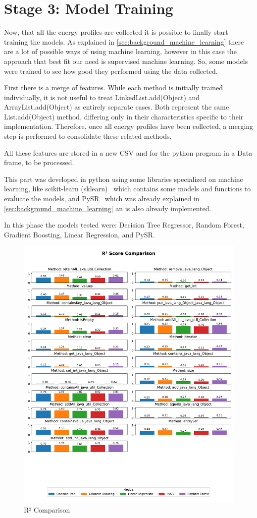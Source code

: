 \section{Stage 3: Model Training} \label{sec:work_stage3_model_training}

Now, that all the energy profiles are collected it is possible to finally start training the models. As explained in \ref{sec:background_machine_learning} there are a lot of possible ways of using machine learning, however in this case the approach that best fit our need is supervised machine learning. So, some models were trained to see how good they performed using the data collected.

First there is a merge of features. While each method is initially trained individually, it is not useful to treat LinkedList.add(Object) and ArrayList.add(Object) as entirely separate cases. Both represent the same List.add(Object) method, differing only in their characteristics specific to their implementation. Therefore, once all energy profiles have been collected, a merging step is performed to consolidate these related methods.

All these features are stored in a new CSV and for the python program in a Data frame, to be processed.

This part was developed in python using some libraries specialized on machine learning, like scikit-learn (sklearn)~\cite{scikit-learn} which contains some models and functions to evaluate the models, and PySR~\cite{cranmeR²023interpretablemachinelearningscience} which was already explained in \ref{sec:background_machine_learning} an is also already implemented.

In this phase the models tested were: Decision Tree Regressor, Random Forest, Gradient Boosting, Linear Regression, and PySR.

\begin{figure}[htbp]
  \centering
  \includegraphics[width = .8 \textwidth]{figures/r2_comparison.pdf}
  \caption{R² Comparison}
  \label{fig:r2_comparison}
\end{figure}

